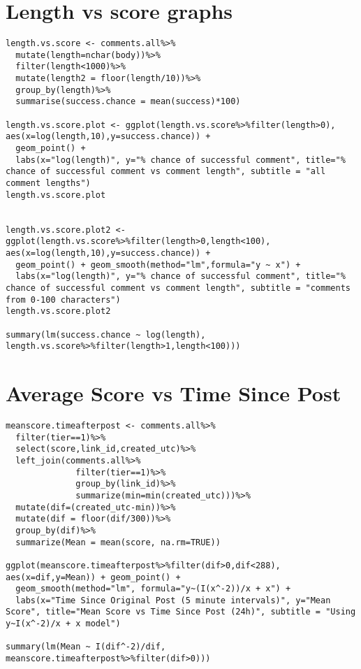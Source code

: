 \section{Length vs score graphs}
\label{sec:AppendexA6}
\begin{lstlisting}
length.vs.score <- comments.all%>%
  mutate(length=nchar(body))%>%
  filter(length<1000)%>%
  mutate(length2 = floor(length/10))%>%
  group_by(length)%>%
  summarise(success.chance = mean(success)*100)

length.vs.score.plot <- ggplot(length.vs.score%>%filter(length>0), aes(x=log(length,10),y=success.chance)) +
  geom_point() + 
  labs(x="log(length)", y="% chance of successful comment", title="% chance of successful comment vs comment length", subtitle = "all comment lengths")
length.vs.score.plot


length.vs.score.plot2 <- ggplot(length.vs.score%>%filter(length>0,length<100), aes(x=log(length,10),y=success.chance)) +
  geom_point() + geom_smooth(method="lm",formula="y ~ x") + 
  labs(x="log(length)", y="% chance of successful comment", title="% chance of successful comment vs comment length", subtitle = "comments from 0-100 characters")
length.vs.score.plot2

summary(lm(success.chance ~ log(length), length.vs.score%>%filter(length>1,length<100)))
\end{lstlisting}

\section{Average Score vs Time Since Post}
\label{sec:AppendexA7}
\begin{lstlisting}
meanscore.timeafterpost <- comments.all%>%
  filter(tier==1)%>%
  select(score,link_id,created_utc)%>%
  left_join(comments.all%>%
              filter(tier==1)%>%
              group_by(link_id)%>%
              summarize(min=min(created_utc)))%>%
  mutate(dif=(created_utc-min))%>%
  mutate(dif = floor(dif/300))%>%
  group_by(dif)%>%
  summarize(Mean = mean(score, na.rm=TRUE))

ggplot(meanscore.timeafterpost%>%filter(dif>0,dif<288), aes(x=dif,y=Mean)) + geom_point() + 
  geom_smooth(method="lm", formula="y~(I(x^-2))/x + x") +
  labs(x="Time Since Original Post (5 minute intervals)", y="Mean Score", title="Mean Score vs Time Since Post (24h)", subtitle = "Using y~I(x^-2)/x + x model")

summary(lm(Mean ~ I(dif^-2)/dif, meanscore.timeafterpost%>%filter(dif>0)))
\end{lstlisting}

